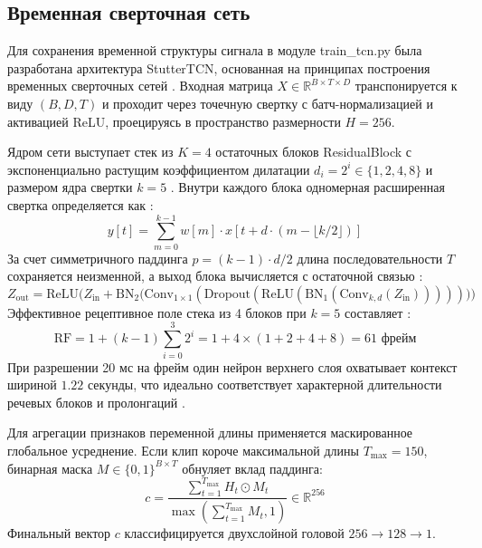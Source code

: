 \documentclass[a4paper,14pt]{extarticle}
\begin{document}
	\subsection{Временная сверточная сеть}
	Для сохранения временной структуры сигнала в модуле train\_\allowbreak tcn.py была разработана архитектура StutterTCN, основанная на принципах построения временных сверточных сетей \cite{tcn}. Входная матрица $X \in \mathbb{R}^{B \times T \times D}$ транспонируется к виду $(B, D, T)$ и проходит через точечную свертку с батч-нормализацией и активацией ReLU, проецируясь в пространство размерности $H = 256$.
	
	Ядром сети выступает стек из $K = 4$ остаточных блоков ResidualBlock с экспоненциально растущим коэффициентом дилатации $d_i = 2^i \in \{1, 2, 4, 8\}$ и размером ядра свертки $k = 5$ \cite{tcn}. Внутри каждого блока одномерная расширенная свертка определяется как \cite{tcn}:
	\begin{equation}
		y[t] = \sum_{m=0}^{k-1} w[m] \cdot x\left[t + d \cdot \left(m - \lfloor k/2 \rfloor\right)\right]
	\end{equation}
	За счет симметричного паддинга $p = (k - 1) \cdot d / 2$ длина последовательности $T$ сохраняется неизменной, а выход блока вычисляется с остаточной связью \cite{tcn}:
	\begin{equation}
		Z_{\text{out}} = \text{ReLU}\Big( Z_{\text{in}} + \text{BN}_2\big(\text{Conv}_{1\times 1}(\text{Dropout}(\text{ReLU}(\text{BN}_1(\text{Conv}_{k, d}(Z_{\text{in}})))))\big) \Big)
	\end{equation}
	Эффективное рецептивное поле стека из 4 блоков при $k=5$ составляет \cite{tcn}:
	\begin{equation}
		\text{RF} = 1 + (k - 1) \sum_{i=0}^{3} 2^i = 1 + 4 \times (1 + 2 + 4 + 8) = 61\text{ фрейм}
	\end{equation}
	При разрешении 20 мс на фрейм один нейрон верхнего слоя охватывает контекст шириной $1.22$ секунды, что идеально соответствует характерной длительности речевых блоков и пролонгаций \cite{ivankin, sep28k}.
	
	Для агрегации признаков переменной длины применяется маскированное глобальное усреднение. Если клип короче максимальной длины $T_{\text{max}} = 150$, бинарная маска $M \in \{0, 1\}^{B \times T}$ обнуляет вклад паддинга:
	\begin{equation}
		c = \frac{\sum_{t=1}^{T_{\text{max}}} H_t \odot M_t}{\max\left(\sum_{t=1}^{T_{\text{max}}} M_t, 1\right)} \in \mathbb{R}^{256}
	\end{equation}
	Финальный вектор $c$ классифицируется двухслойной головой $256 \to 128 \to 1$.
	
\end{document}

